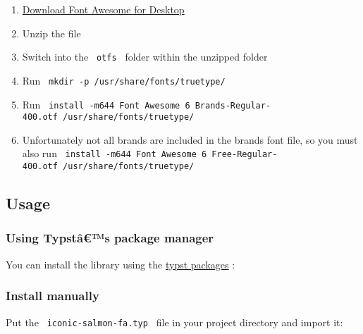 \begin{enumerate}
\tightlist
\item
  \href{https://fontawesome.com/download}{Download Font Awesome for
  Desktop}
\item
  Unzip the file
\item
  Switch into the \texttt{\ otfs\ } folder within the unzipped folder
\item
  Run \texttt{\ mkdir\ -p\ /usr/share/fonts/truetype/\ }
\item
  Run
  \texttt{\ install\ -m644\ \textquotesingle{}Font\ Awesome\ 6\ Brands-Regular-400.otf\textquotesingle{}\ /usr/share/fonts/truetype/\ }
\item
  Unfortunately not all brands are included in the brands font file, so
  you must also run
  \texttt{\ install\ -m644\ \textquotesingle{}Font\ Awesome\ 6\ Free-Regular-400.otf\textquotesingle{}\ /usr/share/fonts/truetype/\ }
\end{enumerate}

\subsection{Usage}\label{usage}

\subsubsection{Using Typstâ€™s package
manager}\label{using-typstuxe2s-package-manager}

You can install the library using the
\href{https://github.com/typst/packages}{typst packages} :

\begin{Shaded}
\begin{Highlighting}[]
\end{Highlighting}
\end{Shaded}

\subsubsection{Install manually}\label{install-manually}

Put the \texttt{\ iconic-salmon-fa.typ\ } file in your project directory
and import it:

\begin{Shaded}
\begin{Highlighting}[]
\end{Highlighting}
\end{Shaded}

